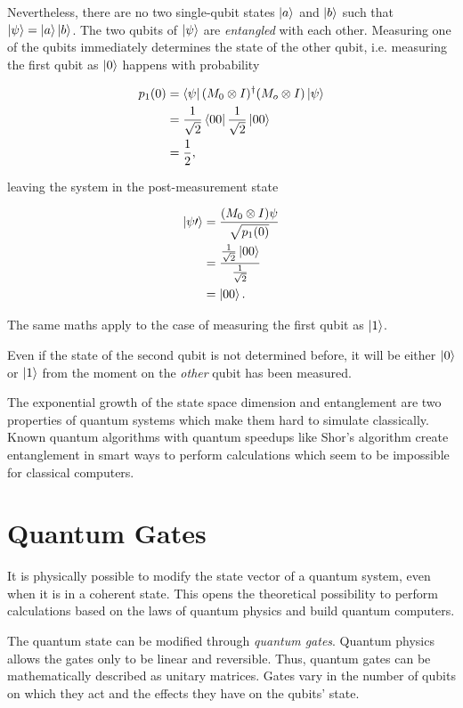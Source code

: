 Nevertheless, there are no two single-qubit states $\Ket{a}$
and $\Ket{b}$ such that $\Ket{\psi} = \Ket{a} \Ket{b}$. The two qubits of
$\Ket{\psi}$ are \textit{entangled} with each other. Measuring one of the qubits
immediately determines the state of the other qubit, i.e. measuring the first
qubit as $\Ket{0}$ happens with probability

\begin{align}
  p_1(0) &= \Bra{\psi} (M_0 \otimes I)^{\dagger} (M_o \otimes I) \Ket{\psi} \\
         &= \frac{1}{\sqrt{2}} \Bra{00} \frac{1}{\sqrt{2}} \Ket{00} \\
         &= \frac{1}{2},
\end{align}

leaving the system in the post-measurement state

\begin{align}
  \Ket{\psi\prime} &= \frac{(M_0 \otimes I) \psi}{\sqrt{p_1(0)}} \\
                   &= \frac{\frac{1}{\sqrt{2}} \Ket{00}}{\frac{1}{\sqrt{2}}} \\
                   &= \Ket{00}.
\end{align}

The same maths apply to the case of measuring the first qubit as $\Ket{1}$.

Even if the state of the second qubit is not determined before, it will be
either $\Ket{0}$ or $\Ket{1}$ from the moment on the \textit{other} qubit has been measured.

The exponential growth of the state space dimension and entanglement are two 
properties of quantum systems which make them hard to simulate
classically.
Known quantum algorithms with quantum speedups like Shor's algorithm
create entanglement in smart ways to perform calculations which seem
to be impossible for classical computers.

\section{Quantum Gates}
\label{sec:quantum_gates}

It is physically possible to modify the state vector of a quantum system, even
when it is in a coherent state. This opens the theoretical possibility to perform
calculations based on the laws of quantum physics and build quantum computers.

The quantum state can be modified through \textit{quantum gates}. 
Quantum physics allows the gates only to be linear and reversible. Thus,
quantum gates can be mathematically described as unitary matrices. Gates vary in the number of
qubits on which they act and the effects they have on the qubits' state.

